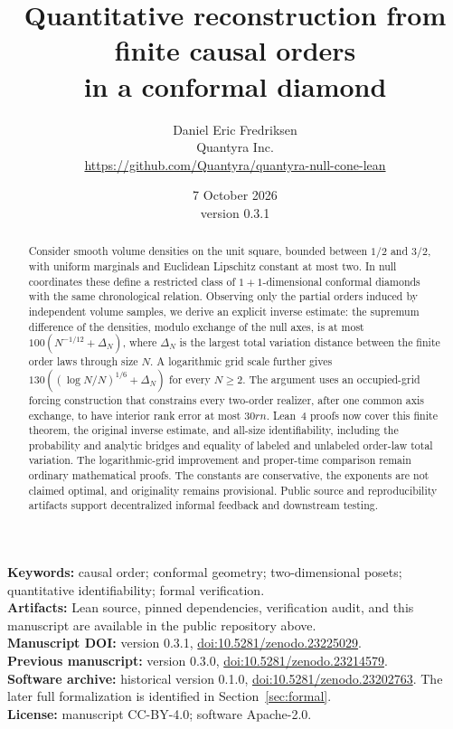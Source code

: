 \documentclass[11pt]{article}
\title{Quantitative reconstruction from finite causal orders\\in a conformal diamond}
\author{Daniel Eric Fredriksen\\Quantyra Inc.\\\url{https://github.com/Quantyra/quantyra-null-cone-lean}}
\date{7 October 2026 \\ version 0.3.1}
\theoremstyle{remark}
\begin{document}
\maketitle
\begin{abstract}
Consider smooth volume densities on the unit square, bounded between
$1/2$ and $3/2$, with uniform marginals and Euclidean Lipschitz constant at
most two. In null coordinates these define a restricted class of
$1+1$-dimensional conformal diamonds with the same chronological relation.
Observing only the partial orders induced by independent volume samples,
we derive an explicit inverse estimate: the supremum difference of the
densities, modulo exchange of the null axes, is at most
$100(N^{-1/12}+\Delta_N)$, where $\Delta_N$ is the largest total variation
distance between the finite order laws through size $N$. A logarithmic
grid scale further gives $130((\log N/N)^{1/6}+\Delta_N)$ for every
$N\ge2$. The argument
uses an occupied-grid forcing construction that constrains every
two-order realizer, after one common axis exchange, to have interior
rank error at most $30rn$. Lean~4 proofs now cover this finite theorem,
the original inverse estimate, and all-size identifiability, including
the probability and analytic bridges and equality of labeled and
unlabeled order-law total variation. The logarithmic-grid improvement
and proper-time comparison remain ordinary mathematical proofs.
The constants are conservative, the exponents are not claimed optimal,
and originality remains provisional. Public source and reproducibility
artifacts support decentralized informal feedback and downstream testing.
\end{abstract}

\noindent\textbf{Keywords:} causal order; conformal geometry; two-dimensional
posets; quantitative identifiability; formal verification.\\
\textbf{Artifacts:} Lean source, pinned dependencies, verification audit,
and this manuscript are available in the public repository above.\\
\textbf{Manuscript DOI:} version 0.3.1,
\href{https://doi.org/10.5281/zenodo.23225029}{doi:10.5281/zenodo.23225029}.\\
\textbf{Previous manuscript:} version 0.3.0,
\href{https://doi.org/10.5281/zenodo.23214579}{doi:10.5281/zenodo.23214579}.\\
\textbf{Software archive:} historical version 0.1.0,
\href{https://doi.org/10.5281/zenodo.23202763}{doi:10.5281/zenodo.23202763}.
The later full formalization is identified in Section~\ref{sec:formal}.\\
\textbf{License:} manuscript CC-BY-4.0; software Apache-2.0.
\end{document}
